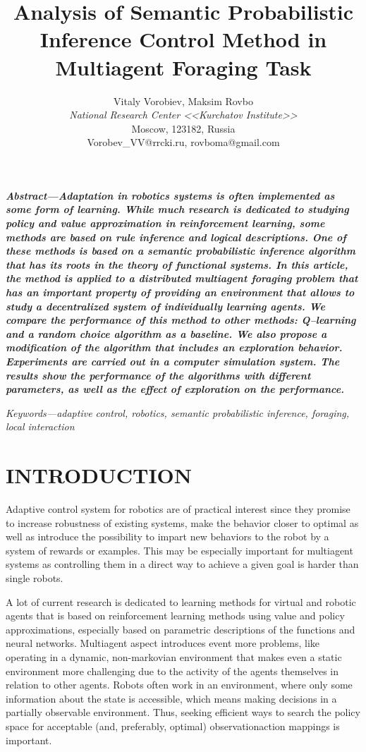 \documentclass[a4paper,twocolumn]{article}
\title{
\bfseries \huge 
	Analysis of Semantic Probabilistic
	Inference Control Method in Multiagent Foraging Task}
\author{Vitaly Vorobiev, Maksim Rovbo\\
\textit{National Research Center <<Kurchatov Institute>>}\\
Moscow, 123182, Russia\\
Vorobev\_{}VV@rrcki.ru, rovboma@gmail.com}
\date{}
\begin{document}
	\maketitle
	{\bfseries\slshape{Abstract}---Adaptation in robotics systems is often implemented as some form of learning. While much research is
dedicated to studying policy and value approximation in
reinforcement learning, some methods are based on rule
inference and logical descriptions. One of these methods
is based on a semantic probabilistic inference algorithm
that has its roots in the theory of functional systems.
In this article, the method is applied to a distributed
multiagent foraging problem that has an important property of providing an environment that allows to study a
decentralized system of individually learning agents. We
compare the performance of this method to other methods:
Q--learning and a random choice algorithm as a baseline.
We also propose a modification of the algorithm that
includes an exploration behavior. Experiments are carried
out in a computer simulation system. The results show the
performance of the algorithms with different parameters,
as well as the effect of exploration on the performance.

\slshape{Keywords}---adaptive control, robotics, semantic probabilistic inference, foraging, local interaction}


\section{INTRODUCTION}

Adaptive control system for robotics are of practical
interest since they promise to increase robustness of
existing systems, make the behavior closer to optimal as
well as introduce the possibility to impart new behaviors
to the robot by a system of rewards or examples. This
may be especially important for multiagent systems as
controlling them in a direct way to achieve a given goal
is harder than single robots.

A lot of current research is dedicated to learning
methods for virtual and robotic agents that is based on
reinforcement learning methods using value and policy
approximations, especially based on parametric descriptions of the functions and neural networks. Multiagent
aspect introduces event more problems, like operating in
a dynamic, non-markovian environment that makes even
a static environment more challenging due to the activity
of the agents themselves in relation to other agents.
Robots often work in an environment, where only some
information about the state is accessible, which means
making decisions in a partially observable environment.
Thus, seeking efficient ways to search the policy space
for acceptable (and, preferably, optimal) observationaction mappings is important.
\end{document}
